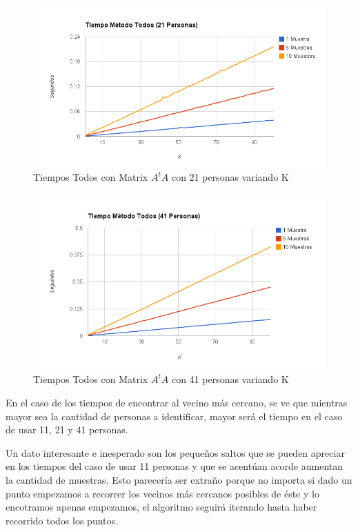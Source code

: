 \begin{figure}[H]
\includegraphics[width=1\textwidth]{img/image5.png}
     \caption{Tiempos Todos con Matrix $A^tA$ con 21 personas variando K}
\end{figure}

\begin{figure}[H]
\includegraphics[width=1\textwidth]{img/image6.png}
     \caption{Tiempos Todos con Matrix $A^tA$ con 41 personas variando K}
\end{figure}

En el caso de los tiempos de encontrar al vecino más cercano, se ve que mientras mayor sea la
cantidad de personas a identificar, mayor será el tiempo en el caso de usar 11, 21 y 41 personas.

Un dato interesante e inesperado son los pequeños saltos que se pueden apreciar en los tiempos del
caso de usar 11 personas y que se acentúan acorde aumentan la cantidad de muestras. Esto parecería
ser extraño porque no importa si dado un punto empezamos a recorrer los vecinos más cercanos
posibles de éste y lo encotramos apenas empezamos, el algoritmo seguirá iterando hasta haber
recorrido todos los puntos.

